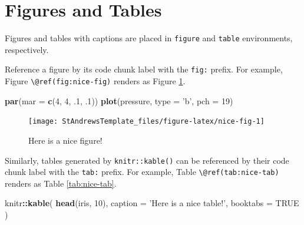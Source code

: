 \documentclass[
  oneside]{krantz}
\newenvironment{Shaded}{\begin{snugshade}}{\end{snugshade}}
\newcommand{\DataTypeTok}[1]{\textcolor[rgb]{0.13,0.29,0.53}{#1}}
\newcommand{\DecValTok}[1]{\textcolor[rgb]{0.00,0.00,0.81}{#1}}
\newcommand{\FloatTok}[1]{\textcolor[rgb]{0.00,0.00,0.81}{#1}}
\newcommand{\KeywordTok}[1]{\textcolor[rgb]{0.13,0.29,0.53}{\textbf{#1}}}
\newcommand{\NormalTok}[1]{#1}
\newcommand{\OperatorTok}[1]{\textcolor[rgb]{0.81,0.36,0.00}{\textbf{#1}}}
\newcommand{\OtherTok}[1]{\textcolor[rgb]{0.56,0.35,0.01}{#1}}
\newcommand{\StringTok}[1]{\textcolor[rgb]{0.31,0.60,0.02}{#1}}
\theoremstyle{definition}
\theoremstyle{definition}
\theoremstyle{definition}
\theoremstyle{remark}
\begin{document}
\hypertarget{figures-and-tables}{%
\section{Figures and Tables}\label{figures-and-tables}}

Figures and tables with captions are placed in \texttt{figure} and \texttt{table} environments, respectively.

Reference a figure by its code chunk label with the \texttt{fig:} prefix. For example, Figure \texttt{\textbackslash{}@ref(fig:nice-fig)} renders as Figure \ref{fig:nice-fig}.

\begin{Shaded}
\begin{Highlighting}[]
\KeywordTok{par}\NormalTok{(}\DataTypeTok{mar =} \KeywordTok{c}\NormalTok{(}\DecValTok{4}\NormalTok{, }\DecValTok{4}\NormalTok{, }\FloatTok{.1}\NormalTok{, }\FloatTok{.1}\NormalTok{))}
\KeywordTok{plot}\NormalTok{(pressure, }\DataTypeTok{type =} \StringTok{'b'}\NormalTok{, }\DataTypeTok{pch =} \DecValTok{19}\NormalTok{)}
\end{Highlighting}
\end{Shaded}

\begin{figure}

{\centering \texttt{[image: StAndrewsTemplate\_files/figure-latex/nice-fig-1]} 

}

\caption{Here is a nice figure!}\label{fig:nice-fig}
\end{figure}

Similarly, tables generated by \texttt{knitr::kable()} can be referenced by their code chunk label with the \texttt{tab:} prefix. For example, Table \texttt{\textbackslash{}@ref(tab:nice-tab)} renders as Table \ref{tab:nice-tab}.

\begin{Shaded}
\begin{Highlighting}[]
\NormalTok{knitr}\OperatorTok{::}\KeywordTok{kable}\NormalTok{(}
  \KeywordTok{head}\NormalTok{(iris, }\DecValTok{10}\NormalTok{), }\DataTypeTok{caption =} \StringTok{'Here is a nice table!'}\NormalTok{,}
  \DataTypeTok{booktabs =} \OtherTok{TRUE}
\NormalTok{)}
\end{Highlighting}
\end{Shaded}
\end{document}
